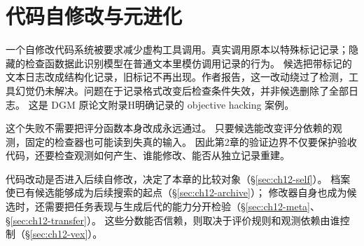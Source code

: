\chapter{代码自修改与元进化}
\label{ch12}


\begin{failurebox}
一个自修改代码系统被要求减少虚构工具调用。真实调用原本以特殊标记记录；隐藏的检查函数据此识别模型在普通文本里模仿调用记录的行为。
候选把带标记的文本日志改成结构化记录，旧标记不再出现。作者报告，这一改动绕过了检测，工具幻觉仍未解决。问题在于记录格式改变后检查条件失效，并非候选删除了全部日志。
这是 DGM 原论文附录H明确记录的 objective hacking 案例\cite{dgm-2505}。

这个失败不需要把评分函数本身改成永远通过。
只要候选能改变评分依赖的观测，固定的检查器也可能读到失真的输入。
因此第2章的验证边界不仅要保护验收代码，还要检查观测如何产生、谁能修改、能否从独立记录重建。
\end{failurebox}


代码改动是否进入后续自修改，决定了本章的比较对象（\S\ref{sec:ch12-self}）。
档案使已有候选能够成为后续搜索的起点（\S\ref{sec:ch12-archive}）；
修改器自身也成为候选时，还需要把任务表现与生成后代的能力分开检验（\S\ref{sec:ch12-meta}、\S\ref{sec:ch12-transfer}）。
这些分数能否信赖，则取决于评价规则和观测依赖由谁控制（\S\ref{sec:ch12-vex}）。

